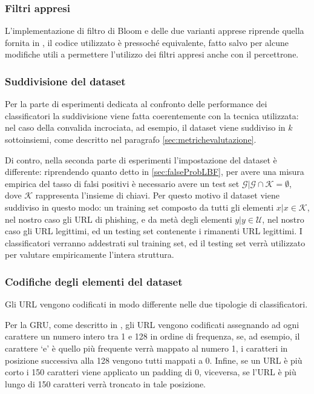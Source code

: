 \documentclass[../../main.tex]{subfiles}
\begin{document}
    \subsubsection{Filtri appresi}
    L'implementazione di filtro di Bloom e delle due varianti apprese riprende quella fornita in \cite{ma2020}, il codice utilizzato è pressoché equivalente, fatto salvo per alcune modifiche utili a permettere l'utilizzo dei filtri appresi anche con il percettrone.

    \subsubsection{Suddivisione del dataset}
    Per la parte di esperimenti dedicata al confronto delle performance dei classificatori la suddivisione viene fatta coerentemente con la tecnica utilizzata: nel caso della convalida incrociata, ad esempio, il dataset viene suddiviso in $k$ sottoinsiemi, come descritto nel paragrafo \ref{sec:metrichevalutazione}.

    Di contro, nella seconda parte di esperimenti l'impostazione del dataset è differente: riprendendo quanto detto in \ref{sec:falseProbLBF}, per avere una misura empirica del tasso di falsi positivi è necessario avere un test set $\mathcal{G} | \mathcal{G} \cap \mathcal{K} = \emptyset$, dove $\mathcal{K}$ rappresenta l'insieme di chiavi. Per questo motivo il dataset viene suddiviso in questo modo: un training set composto da tutti gli elementi $x | x \in \mathcal{K}$, nel nostro caso gli URL di phishing, e da metà degli elementi $y | y \in \mathcal{U}$, nel nostro caso gli URL legittimi, ed un testing set contenente i rimanenti URL legittimi. I classificatori verranno addestrati sul training set, ed il testing set verrà utilizzato per valutare empiricamente l'intera struttura.

    \subsubsection{Codifiche degli elementi del dataset}
    Gli URL vengono codificati in modo differente nelle due tipologie di classificatori.

    Per la GRU, come descritto in \cite{ma2020}, gli URL vengono codificati assegnando ad ogni carattere un numero intero tra 1 e 128 in ordine di frequenza, se, ad esempio, il carattere `e' è quello più frequente verrà mappato al numero 1, i caratteri in posizione successiva alla 128 vengono tutti mappati a 0. Infine, se un URL è più corto i 150 caratteri viene applicato un padding di 0, viceversa, se l'URL è più lungo di 150 caratteri verrà troncato in tale posizione.
\end{document}
